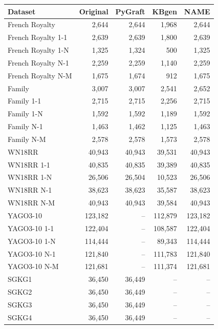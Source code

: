 \begin{tabular}{lrrrr}
\toprule
Dataset & Original & PyGraft & KBgen & NAME \\
\midrule
French Royalty & 2{,}644 & 2{,}644 & 1{,}968 & 2{,}644 \\
French Royalty 1-1 & 2{,}639 & 2{,}639 & 1{,}800 & 2{,}639 \\
French Royalty 1-N & 1{,}325 & 1{,}324 & 500 & 1{,}325 \\
French Royalty N-1 & 2{,}259 & 2{,}259 & 1{,}140 & 2{,}259 \\
French Royalty N-M & 1{,}675 & 1{,}674 & 912 & 1{,}675 \\
\midrule
Family & 3{,}007 & 3{,}007 & 2{,}541 & 2{,}652 \\
Family 1-1 & 2{,}715 & 2{,}715 & 2{,}256 & 2{,}715 \\
Family 1-N & 1{,}592 & 1{,}592 & 1{,}189 & 1{,}592 \\
Family N-1 & 1{,}463 & 1{,}462 & 1{,}125 & 1{,}463 \\
Family N-M & 2{,}578 & 2{,}578 & 1{,}573 & 2{,}578 \\
\midrule
WN18RR & 40{,}943 & 40{,}943 & 39{,}531 & 40{,}943 \\
WN18RR 1-1 & 40{,}835 & 40{,}835 & 39{,}389 & 40{,}835 \\
WN18RR 1-N & 26{,}506 & 26{,}504 & 10{,}523 & 26{,}506 \\
WN18RR N-1 & 38{,}623 & 38{,}623 & 35{,}587 & 38{,}623 \\
WN18RR N-M & 40{,}943 & 40{,}943 & 39{,}584 & 40{,}943 \\
\midrule
YAGO3-10 & 123{,}182 & – & 112{,}879 & 123{,}182 \\
YAGO3-10 1-1 & 122{,}404 & – & 108{,}587 & 122{,}404 \\
YAGO3-10 1-N & 114{,}444 & – & 89{,}343 & 114{,}444 \\
YAGO3-10 N-1 & 121{,}840 & – & 111{,}783 & 121{,}840 \\
YAGO3-10 N-M & 121{,}681 & – & 111{,}374 & 121{,}681 \\
\midrule
SGKG1 & 36{,}450 & 36{,}449 & – & – \\
SGKG2 & 36{,}450 & 36{,}449 & – & – \\
SGKG3 & 36{,}450 & 36{,}449 & – & – \\
SGKG4 & 36{,}450 & 36{,}449 & – & – \\
\bottomrule
\end{tabular}
